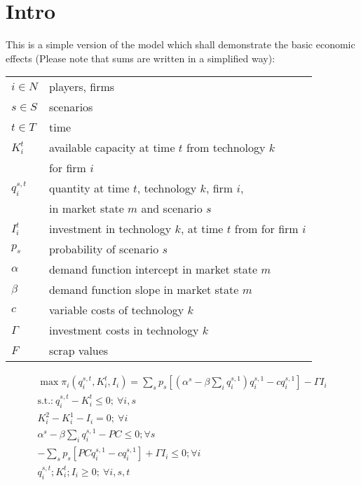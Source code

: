 \documentclass[a4paper,12pt]{article}
\theoremstyle{remark}
\begin{document}
  \section{Intro}

This is a simple version of the model which shall demonstrate the basic economic effects (Please note that sums are written in a simplified way):

\begin{tabular}[c]{l l}
$i\in N$        & players, firms\\
$s\in S$       	& scenarios\\
$t\in T$	& time \\
$K_{i}^t$      & available capacity at time $t$ from technology $k$ \\
                & for firm $i$ \\
$q_{i}^{s,t}$ & quantity at time $t$, technology $k$, firm $i$, \\
                & in market state $m$ and scenario $s$ \\			
$I_{i}^t$   & investment in technology $k$, at time $t$ from for firm $i$\\
$p_s$        & probability of scenario $s$\\
$\alpha$  & demand function intercept in market state $m$ \\
$\beta$   & demand function slope in market state $m$ \\
$c$	     & variable costs of technology $k$	\\
$\Gamma$   & investment costs in technology $k$  \\
$F$        & scrap values  \\
\end{tabular}

\begin{gather}
	\max \pi_i(q_{i}^{s,t},K^t_{i},I_{i})=
	\sum_s p_s \left[ (\alpha^s- \beta \sum_i q_{i}^{s,1}) q_{i}^{s,1} - c q_{i}^{s,1}  \right] - \Gamma I_{i}  \\       
			\text{s.t.:} \  q_{i}^{s,t} - K^{t}_{i} \leq 0; \ \forall i,s  \label{eq:oligopmax2}\\ 
										  K^{2}_{i}  - K^{1}_{i}  - I_{i} = 0 ; \ \forall i  \label{eq:ologopmax5} \\  
										  \alpha^s - \beta \sum_i q_i^{s,1} - PC \leq 0; \forall s \\ \nonumber 
										  -\sum_s p_s \left[ PC q_{i}^{s,1} - c q_{i}^{s,1} \right] + \Gamma I_{i} \leq 0; \forall i \\ \nonumber 
 										  q_{i}^{s,t};K^t_{i};I_{i}	\geq 0; \ \forall i,s,t   \nonumber
\end{gather}
\end{document}

